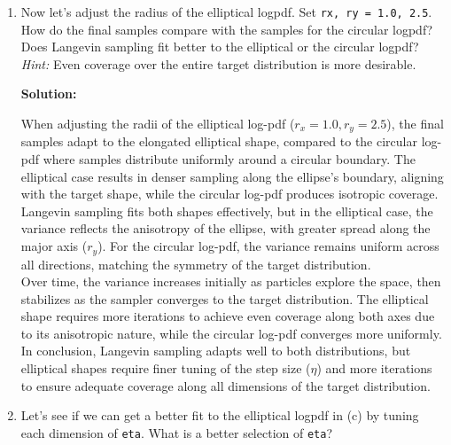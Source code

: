 \documentclass{article}
\newenvironment{solution}{\color{blue} \smallskip \textbf{Solution:}}{}
\begin{document}
\begin{enumerate}
\begin{solution}
    \end{solution}

    \item 
    Now let's adjust the radius of the elliptical logpdf. 
    Set \texttt{rx, ry = 1.0, 2.5}. 
    How do the final samples compare with the samples for the circular logpdf? 
    Does Langevin sampling fit better to the elliptical or the circular logpdf? \\
    \textit{Hint:} Even coverage over the entire target distribution is more desirable.

    \begin{solution}
    
When adjusting the radii of the elliptical log-pdf (\( r_x = 1.0, r_y = 2.5 \)), the final samples adapt to the elongated elliptical shape, compared to the circular log-pdf where samples distribute uniformly around a circular boundary. The elliptical case results in denser sampling along the ellipse's boundary, aligning with the target shape, while the circular log-pdf produces isotropic coverage.\\

Langevin sampling fits both shapes effectively, but in the elliptical case, the variance reflects the anisotropy of the ellipse, with greater spread along the major axis (\( r_y \)). For the circular log-pdf, the variance remains uniform across all directions, matching the symmetry of the target distribution.\\

Over time, the variance increases initially as particles explore the space, then stabilizes as the sampler converges to the target distribution. The elliptical shape requires more iterations to achieve even coverage along both axes due to its anisotropic nature, while the circular log-pdf converges more uniformly.\\

In conclusion, Langevin sampling adapts well to both distributions, but elliptical shapes require finer tuning of the step size (\( \eta \)) and more iterations to ensure adequate coverage along all dimensions of the target distribution.\\

    \end{solution}

    \item 
    Let's see if we can get a better fit to the elliptical logpdf in (c) by tuning each dimension of \texttt{eta}. 
    What is a better selection of \texttt{eta}?


\end{enumerate}
\end{document}
